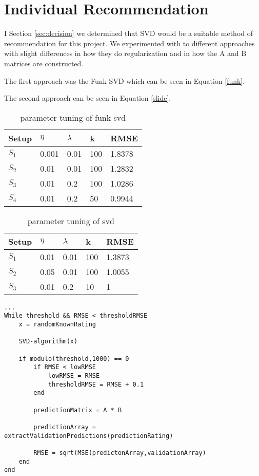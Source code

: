 \section{Individual Recommendation}\label{sec:individual_recommendation}
I Section \ref{sec:decision} we determined that SVD would be a suitable method of recommendation for this project. 
We experimented with to different approaches with slight differences in how they do regularization and in how the A and B matrices are constructed.

The first approach was the Funk-SVD which can be seen in Equation \ref{funk}.  

The second approach can be seen in Equation \ref{slide}.


\begin{table}[h]
\centering
\caption{parameter tuning of funk-svd}
\label{my-label}
\begin{tabular}{|l|llll|}
\hline
Setup	& $\eta$ & $\lambda$ & k   & RMSE   \\ \hline
$S_1$	& 0.001  & 0.01      & 100 & 1.8378 \\ \hline
$S_2$	& 0.01   & 0.01      & 100 & 1.2832 \\ \hline
$S_3$	& 0.01   & 0.2       & 100 & 1.0286 \\ \hline
$S_4$	& 0.01   & 0.2		 & 50  & 0.9944 \\ \hline
\end{tabular}
\end{table}

\begin{table}[h]
\centering
\caption{parameter tuning of svd}
\label{my-label}
\begin{tabular}{|l|llll|}
\hline
Setup	& $\eta$ & $\lambda$ & k   & RMSE \\ \hline
$S_1$	& 0.01   & 0.01   & 100 & 1.3873  \\ \hline
$S_2$	& 0.05   & 0.01   & 100  & 1.0055 \\ \hline
$S_3$	& 0.01   & 0.2    & 10 & 1		  \\ \hline
\end{tabular}
\end{table}
\begin{lstlisting}[caption={Training of the prediction matrix},label=lst:SVD]
...
While threshold && RMSE < thresholdRMSE
	x = randomKnownRating
	
	SVD-algorithm(x)
	
	if modulo(threshold,1000) == 0
		if RMSE < lowRMSE 
			lowRMSE = RMSE 
			thresholdRMSE = RMSE + 0.1
		end
		
		predictionMatrix = A * B
		
		predictionArray = extractValidationPredictions(predictionRating)
		
		RMSE = sqrt(MSE(predictonArray,validationArray)	
	end
end
\end{lstlisting}

